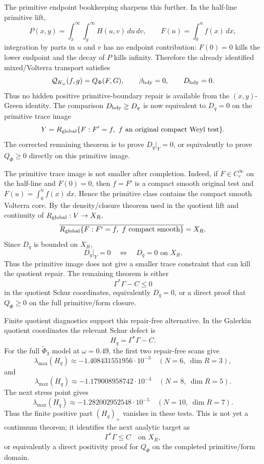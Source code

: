 \documentclass[11pt]{article}
\begin{document}
The primitive endpoint bookkeeping sharpens this further.  In the half-line
primitive lift,
\[
  P(x,y)=\int_x^\infty\int_y^\infty H(u,v)\,du\,dv,\qquad
  F(u)=\int_0^u f(x)\,dx,
\]
integration by parts in \(u\) and \(v\) has no endpoint contribution:
\(F(0)=0\) kills the lower endpoint and the decay of \(P\) kills infinity.
Therefore the already identified mixed/Volterra transport satisfies
\[
  \mathcal Q_{K_\omega}(f,g)=Q_\Phi(F,G),
  \qquad
  \beta_{\rm bdy}=0,\qquad D_{\rm bdy}=0.
\]
Thus no hidden positive primitive-boundary repair is available from the
\((x,y)\)-Green identity.  The comparison \(D_{\rm bdy}\ge D_q\) is now
equivalent to \(D_q=0\) on the primitive trace image
\[
  Y=R_{\rm global}\{F:F'=f,\ f \text{ an original compact Weyl test}\}.
\]
The corrected remaining theorem is to prove \(D_q|_Y=0\), or equivalently to
prove \(Q_\Phi\ge0\) directly on this primitive image.

The primitive trace image is not smaller after completion.  Indeed, if
\(F\in C_c^\infty\) on the half-line and \(F(0)=0\), then \(f=F'\) is a
compact smooth original test and \(F(u)=\int_0^u f(x)\,dx\).  Hence the
primitive class contains the compact smooth Volterra core.  By the
density/closure theorem used in the quotient lift and continuity of
\(R_{\rm global}:V\to X_R\),
\[
  \overline{
  R_{\rm global}\{F:F'=f,\ f \text{ compact smooth}\}}
  =X_R .
\]
Since \(D_q\) is bounded on \(X_R\),
\[
  D_q|_Y=0 \quad\Longleftrightarrow\quad D_q=0\text{ on }X_R .
\]
Thus the primitive image does not give a smaller trace constraint that can kill
the quotient repair.  The remaining theorem is either
\[
  \Gamma^\ast\Gamma-C\le0
\]
in the quotient Schur coordinates, equivalently \(D_q=0\), or a direct proof
that \(Q_\Phi\ge0\) on the full primitive/form closure.

Finite quotient diagnostics support this repair-free alternative.  In the
Galerkin quotient coordinates the relevant Schur defect is
\[
  H_q=\Gamma^\ast\Gamma-C .
\]
For the full \(\widetilde\Phi_3\) model at \(\omega=0.49\), the first two
repair-free scans give
\[
  \lambda_{\max}(H_q)\approx -1.408431551956\cdot10^{-3}
  \quad (N=6,\ \dim R=3),
\]
and
\[
  \lambda_{\max}(H_q)\approx -1.179008958742\cdot10^{-4}
  \quad (N=8,\ \dim R=5).
\]
The next stress point gives
\[
  \lambda_{\max}(H_q)\approx -1.282002952548\cdot10^{-5}
  \quad (N=10,\ \dim R=7).
\]
Thus the finite positive part \((H_q)_+\) vanishes in these tests.  This is not
yet a continuum theorem; it identifies the next analytic target as
\[
  \Gamma^\ast\Gamma\le C\quad\text{on }X_R,
\]
or equivalently a direct positivity proof for \(Q_\Phi\) on the completed
primitive/form domain.
\end{document}

